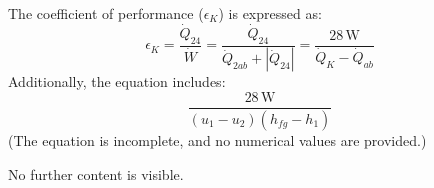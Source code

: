 The coefficient of performance (\( \epsilon_K \)) is expressed as:  
\[
\epsilon_K = \frac{\dot{Q}_{24}}{\dot{W}} = \frac{\dot{Q}_{24}}{\dot{Q}_{2ab} + |\dot{Q}_{24}|} = \frac{28 \, \text{W}}{\dot{Q}_K - \dot{Q}_{ab}}
\]  
Additionally, the equation includes:  
\[
\frac{28 \, \text{W}}{(u_1 - u_2)(h_{fg} - h_1)}
\]  
(The equation is incomplete, and no numerical values are provided.)  

No further content is visible.